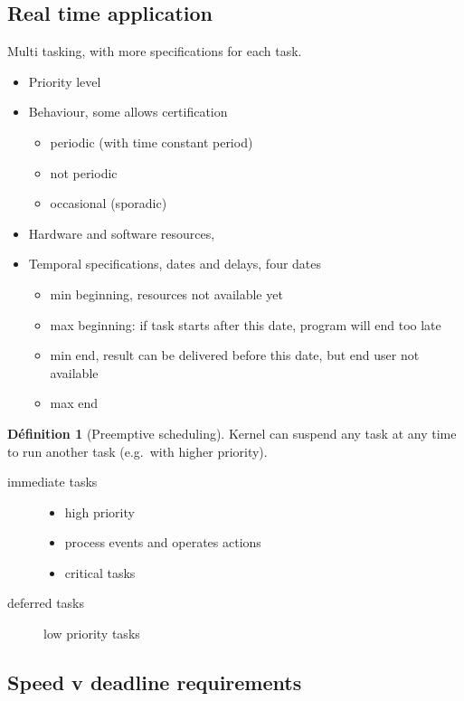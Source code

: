 \documentclass[10pt]{article}
\theoremstyle{plain}
\theoremstyle{definition}
\newtheorem{defn}{Définition}
\theoremstyle{remark}
\begin{document}
\subsection{Real time application}
Multi tasking, with more specifications for each task.
\begin{itemize}
	\item Priority level
	\item Behaviour, some allows certification
		\begin{itemize}
			\item periodic (with time constant period)
			\item not periodic
			\item occasional (sporadic)
		\end{itemize}
	\item Hardware and software resources,
	\item Temporal specifications, dates and delays, four dates
		\begin{itemize}
			\item min beginning, resources not available yet
			\item max beginning: if task starts after this date, program
				will end too late
			\item min end, result can be delivered before this date, but end
				user not available
			\item max end
		\end{itemize}
\end{itemize}

\begin{defn}[Preemptive scheduling]
	Kernel can suspend any task at any time to run another task (e.g.\ with
	higher priority).
\end{defn}

\begin{description}
	\item[immediate tasks]
		\begin{itemize}
			\item high priority
			\item process events and operates actions
			\item critical tasks
		\end{itemize}
	\item[deferred tasks]
		low priority tasks
\end{description}

\subsection{Speed v deadline requirements}
\end{document}
